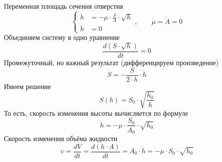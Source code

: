 Переменная площадь сечения отверстия
\begin{equation}\label{eq:hydrodynamics:varSquare}
  \begin{cases}
    \dot{h}  &= - \mu \cdot \frac{S}{A} \cdot \sqrt{h} \\
    \ddot{h} &= 0
  \end{cases},
  \qquad \dot{\mu} = \dot{A} = 0
\end{equation}
Объединяем систему в одно уравнение
\begin{equation*}
  \frac{d\left( S \cdot \sqrt{h} \right)}{dt}
  = 0
\end{equation*}
Промежуточный, но важный результат (дифференцируем произведение)
\begin{equation}\label{eq:hydrodynamics:valuableResult}
  \dot{S}
  = - \frac{S}{2 \cdot h}
    \cdot \dot{h}
\end{equation}
Имеем решение
\begin{equation}\label{eq:hydrodynamics:varSolutionSh}
  S\left( h \right) = S_0 \cdot \sqrt{\frac{h_0}{h}}
\end{equation}
То есть, скорость изменения высоты вычисляется по формуле
\begin{equation*}
  \dot{h} = - \mu \cdot \frac{S_0}{A_0} \cdot \sqrt{h_0}
\end{equation*}
Скорость изменения объёма жидкости
\begin{equation*}
  \upsilon
  = \frac{dV}{dt} = \frac{d\left( h \cdot A \right)}{dt}
  = A_0 \cdot \dot{h}
  = - \mu \cdot S_0 \cdot \sqrt{h_0}
\end{equation*}


